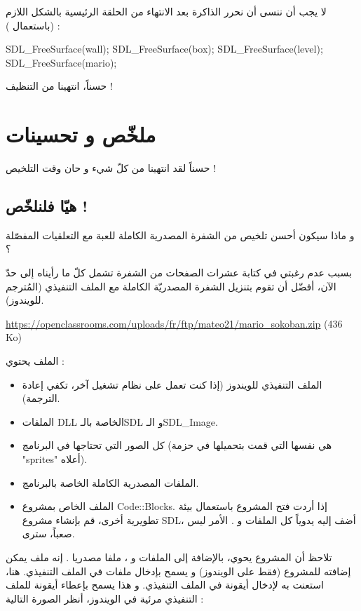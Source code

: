 لا يجب أن ننسى أن نحرر الذاكرة بعد الانتهاء من الحلقة الرئيسية بالشكل اللازم (باستعمال
) :

\begin{Csource}
SDL_FreeSurface(wall);
SDL_FreeSurface(box);
SDL_FreeSurface(level);
SDL_FreeSurface(mario);
\end{Csource}

حسناً، انتهينا من التنظيف !

\section*{ملخّص و تحسينات}

حسناً لقد انتهينا من كلّ شيء و حان وقت التلخيص !

\subsection{هيّا فلنلخّص !}

و ماذا سيكون أحسن تلخيص من الشفرة المصدرية الكاملة للعبة مع التعلقيات المفصّلة ؟

بسبب عدم رغبتي في كتابة عشرات الصفحات من الشفرة تشمل كلّ ما رأيناه إلى حدّ الآن، أفضّل أن تقوم بتنزيل الشفرة المصدريّة الكاملة مع الملف التنفيذي (المُترجم للويندوز).

\textenglish{\url{https://openclassrooms.com/uploads/fr/ftp/mateo21/mario_sokoban.zip} (436 Ko)}

الملف
يحتوي :

\begin{itemize}
	\item الملف التنفيذي للويندوز (إذا كنت تعمل على نظام تشغيل آخر، تكفي إعادة الترجمة).
	\item الملفات
	\textenglish{DLL}
	الخاصة بالـ\textenglish{SDL}
	و الـ\textenglish{SDL\_Image}.
	\item كل الصور التي تحتاجها في البرنامج (هي نفسها التي قمت بتحميلها في حزمة
	"\textenglish{sprites}"
	أعلاه).
	\item الملفات المصدرية الكاملة الخاصة بالبرنامج.
	\item الملف
	الخاص بمشروع 
	\textenglish{Code::Blocks}.
	إذا أردت فتح المشروع باستعمال بيئة تطويرية أخرى، قم بإنشاء مشروع 
	\textenglish{SDL}،
	أضف إليه يدوياً كل الملفات
	و
	.
	الأمر ليس صعباً، سترى.
\end{itemize}

تلاحظ أن المشروع يحوي، بالإضافة إلى الملفات
و
،
ملفا مصدريا
.
إنه ملف يمكن إضافته للمشروع (فقط على الويندوز) و يسمح بإدخال ملفات في الملف التنفيذي. هنا، استعنت به لإدخال أيقونة في الملف التنفيذي. و هذا يسمح بإعطاء أيقونة للملف التنفيذي مرئية في الويندوز، أنظر الصورة التالية :

